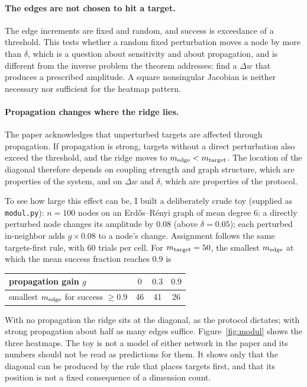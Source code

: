 \documentclass[11pt]{article}
\begin{document}
\paragraph{The edges are not chosen to hit a target.} The edge increments are fixed and random, and success is exceedance of a threshold. This tests whether a random fixed perturbation moves a node by more than $\delta$, which is a question about sensitivity and about propagation, and is different from the inverse problem the theorem addresses: find a $\Delta w$ that produces a prescribed amplitude. A square nonsingular Jacobian is neither necessary nor sufficient for the heatmap pattern.

\paragraph{Propagation changes where the ridge lies.} The paper acknowledges that unperturbed targets are affected through propagation. If propagation is strong, targets without a direct perturbation also exceed the threshold, and the ridge moves to $m_{\rm edge}<m_{\rm target}$. The location of the diagonal therefore depends on coupling strength and graph structure, which are properties of the system, and on $\Delta w$ and $\delta$, which are properties of the protocol.

To see how large this effect can be, I built a deliberately crude toy (supplied as \texttt{modul.py}): $n=100$ nodes on an Erd\H{o}s--R\'enyi graph of mean degree $6$; a directly perturbed node changes its amplitude by $0.08$ (above $\delta=0.05$); each perturbed in-neighbor adds $g\times0.08$ to a node's change. Assignment follows the same targets-first rule, with $60$ trials per cell. For $m_{\rm target}=50$, the smallest $m_{\rm edge}$ at which the mean success fraction reaches $0.9$ is
\begin{center}
\begin{tabular}{lccc}
\toprule
propagation gain $g$ & $0$ & $0.3$ & $0.9$\\
\midrule
smallest $m_{\rm edge}$ for success $\ge0.9$ & 46 & 41 & 26\\
\bottomrule
\end{tabular}
\end{center}
With no propagation the ridge sits at the diagonal, as the protocol dictates; with strong propagation about half as many edges suffice. Figure~\ref{fig:modul} shows the three heatmaps. The toy is not a model of either network in the paper and its numbers should not be read as predictions for them. It shows only that the diagonal can be produced by the rule that places targets first, and that its position is not a fixed consequence of a dimension count.
\end{document}

